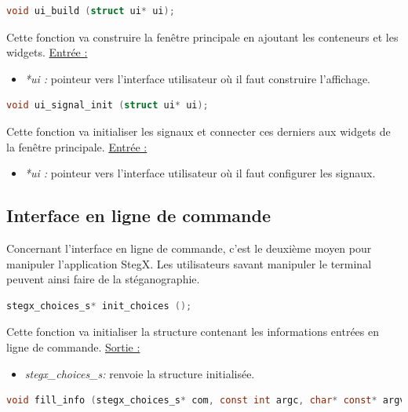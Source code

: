 \documentclass[11pt]{article}
\begin{document}
\begin{lstlisting}[language=c]
void ui_build (struct ui* ui);
\end{lstlisting}

Cette fonction va construire la fenêtre principale en ajoutant les conteneurs 
et les widgets. 
\newline
\underline{Entrée :} 
\begin{itemize}
\item \textit{*ui :} pointeur vers l'interface utilisateur où il faut construire 
l'affichage. 
\newline 
\end{itemize}

\begin{lstlisting}[language=c]
void ui_signal_init (struct ui* ui);
\end{lstlisting}

Cette fonction va initialiser les signaux et connecter ces derniers aux 
widgets de la fenêtre principale. 
\newline
\underline{Entrée :} 
\begin{itemize}
\item \textit{*ui :} pointeur vers l'interface utilisateur où il faut 
configurer les signaux. 
\newline 
\end{itemize}

\subsection{Interface en ligne de commande}

Concernant l'interface en ligne de commande, c'est le deuxième moyen pour 
manipuler l'application StegX. Les utilisateurs savant manipuler le terminal 
peuvent ainsi faire de la stéganographie. 

\begin{lstlisting}[language=c]
stegx_choices_s* init_choices ();
\end{lstlisting}

Cette fonction va initialiser la structure contenant les informations 
entrées en ligne de commande. 
\newline
\underline{Sortie :} 
\begin{itemize}
\item \textit{stegx\_choices\_s:} renvoie la structure initialisée. 
\newline 
\end{itemize}

\begin{lstlisting}[language=c]
void fill_info (stegx_choices_s* com, const int argc, char* const* argv);
\end{lstlisting}
\end{document}
